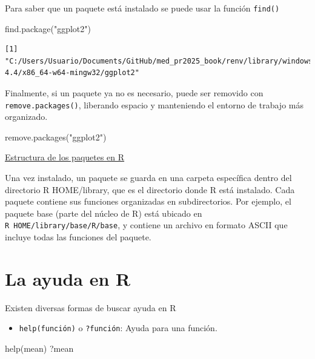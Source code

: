 \documentclass[
  letterpaper,
]{scrbook}
\newenvironment{Shaded}{\begin{snugshade}}{\end{snugshade}}
\newcommand{\FunctionTok}[1]{\textcolor[rgb]{0.28,0.35,0.67}{#1}}
\newcommand{\NormalTok}[1]{\textcolor[rgb]{0.00,0.23,0.31}{#1}}
\newcommand{\StringTok}[1]{\textcolor[rgb]{0.13,0.47,0.30}{#1}}
\providecommand{\tightlist}{%
  \setlength{\itemsep}{0pt}\setlength{\parskip}{0pt}}\usepackage{longtable,booktabs,array}
\begin{document}
Para saber que un paquete está instalado se puede usar la función
\texttt{find()}

\begin{Shaded}
\begin{Highlighting}[]
\FunctionTok{find.package}\NormalTok{(}\StringTok{"ggplot2"}\NormalTok{)}
\end{Highlighting}
\end{Shaded}

\begin{verbatim}
[1] "C:/Users/Usuario/Documents/GitHub/med_pr2025_book/renv/library/windows/R-4.4/x86_64-w64-mingw32/ggplot2"
\end{verbatim}

Finalmente, si un paquete ya no es necesario, puede ser removido con
\texttt{remove.packages()}, liberando espacio y manteniendo el entorno
de trabajo más organizado.

\begin{Shaded}
\begin{Highlighting}[]
\FunctionTok{remove.packages}\NormalTok{(}\StringTok{"ggplot2"}\NormalTok{)}
\end{Highlighting}
\end{Shaded}

\uline{Estructura de los paquetes en R}

Una vez instalado, un paquete se guarda en una carpeta específica dentro
del directorio R HOME/library, que es el directorio donde R está
instalado. Cada paquete contiene sus funciones organizadas en
subdirectorios. Por ejemplo, el paquete base (parte del núcleo de R)
está ubicado en \texttt{R\ HOME/library/base/R/base}, y contiene un
archivo en formato ASCII que incluye todas las funciones del paquete.

\hypertarget{la-ayuda-en-r}{%
\section{La ayuda en R}\label{la-ayuda-en-r}}

Existen diversas formas de buscar ayuda en R

\begin{itemize}
\tightlist
\item
  \texttt{help(función)} o \texttt{?función}: Ayuda para una función.
\end{itemize}

\begin{Shaded}
\begin{Highlighting}[]
\FunctionTok{help}\NormalTok{(mean)}
\NormalTok{?mean}
\end{Highlighting}
\end{Shaded}
\end{document}

